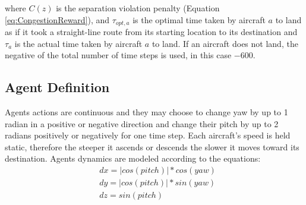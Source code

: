 \documentclass{aamas2014}
\begin{document}
where $C(z)$ is the separation violation penalty (Equation \ref{eq:CongestionReward}), and $\tau_{opt, a}$ is the optimal time taken by aircraft $a$ to land as if it took a straight-line route from its starting location to its destination and $\tau_a$ is the actual time taken by aircraft $a$ to land. If an aircraft does not land, the negative of the total number of time steps is used, in this case $-600$. 


\subsection{Agent Definition}
Agents actions are continuous and they may choose to change yaw by up to 1 radian in a positive or negative direction and change their pitch by up to 2 radians positively or negatively for one time step. Each aircraft's speed is held static, therefore the steeper it ascends or descends the slower it moves toward its destination. Agents dynamics are modeled according to the equations:
%
\begin{equation}
\begin{split}
&dx = |cos(pitch)| * cos(yaw) \\
&dy = |cos(pitch)| * sin(yaw) \\
&dz = sin(pitch) \\
\end{split}
\end{equation}
\end{document}
